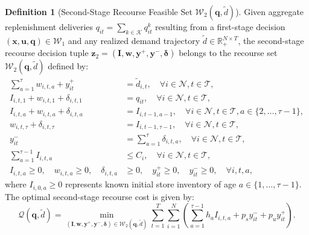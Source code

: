 \documentclass[11pt,a4paper]{article}
\theoremstyle{definition}
\newtheorem{definition}{Definition}
\theoremstyle{remark}
\begin{document}
\begin{definition}[Second-Stage Recourse Feasible Set $\mathcal{W}_2(\mathbf{q}, \tilde{d})$]
\label{def:w2_set}
Given aggregate replenishment deliveries $q_{it} = \sum_{k \in \mathcal{K}} q_{it}^k$ resulting from a first-stage decision $(\mathbf{x}, \mathbf{u}, \mathbf{q}) \in \mathcal{W}_1$ and any realized demand trajectory $\tilde{d} \in \mathbb{R}_+^{N \times T}$, the second-stage recourse decision tuple $\mathbf{z}_2 = (\mathbf{I}, \mathbf{w}, \mathbf{y}^+, \mathbf{y}^-, \boldsymbol{\delta})$ belongs to the recourse set $\mathcal{W}_2(\mathbf{q}, \tilde{d})$ defined by:
\begin{align}
    \sum_{a=1}^\tau w_{i,t,a} + y_{it}^+ &= \tilde{d}_{i,t}, \quad \forall i \in \mathcal{N}, t \in \mathcal{T}, \label{eq:w2_demand} \\
    I_{i,t,1} + w_{i,t,1} + \delta_{i,t,1} &= q_{it}, \quad \forall i \in \mathcal{N}, t \in \mathcal{T}, \label{eq:w2_fresh} \\
    I_{i,t,a} + w_{i,t,a} + \delta_{i,t,a} &= I_{i,t-1,a-1}, \quad \forall i \in \mathcal{N}, t \in \mathcal{T}, a \in \{2, \dots, \tau-1\}, \label{eq:w2_inter} \\
    w_{i,t,\tau} + \delta_{i,t,\tau} &= I_{i,t-1,\tau-1}, \quad \forall i \in \mathcal{N}, t \in \mathcal{T}, \label{eq:w2_spoilage} \\
    y_{it}^- &= \sum_{a=1}^\tau \delta_{i,t,a}, \quad \forall i \in \mathcal{N}, t \in \mathcal{T}, \label{eq:w2_total_disposal} \\
    \sum_{a=1}^{\tau-1} I_{i,t,a} &\le C_i, \quad \forall i \in \mathcal{N}, t \in \mathcal{T}, \label{eq:w2_store_cap} \\
    I_{i,t,a} \ge 0, \quad w_{i,t,a} \ge 0, \quad \delta_{i,t,a} &\ge 0, \quad y_{it}^+ \ge 0, \quad y_{it}^- \ge 0, \quad \forall i, t, a, \label{eq:w2_bounds}
\end{align}
where $I_{i,0,a} \ge 0$ represents known initial store inventory of age $a \in \{1, \dots, \tau-1\}$. The optimal second-stage recourse cost is given by:
\begin{equation}
    \mathcal{Q}(\mathbf{q}, \tilde{d}) = \min_{(\mathbf{I}, \mathbf{w}, \mathbf{y}^+, \mathbf{y}^-, \boldsymbol{\delta}) \in \mathcal{W}_2(\mathbf{q}, \tilde{d})} \sum_{t=1}^T \sum_{i=1}^N \left( \sum_{a=1}^{\tau-1} h_a I_{i,t,a} + p_s y_{it}^- + p_u y_{it}^+ \right). \label{eq:recourse_cost_function}
\end{equation}
\end{definition}
\end{document}
